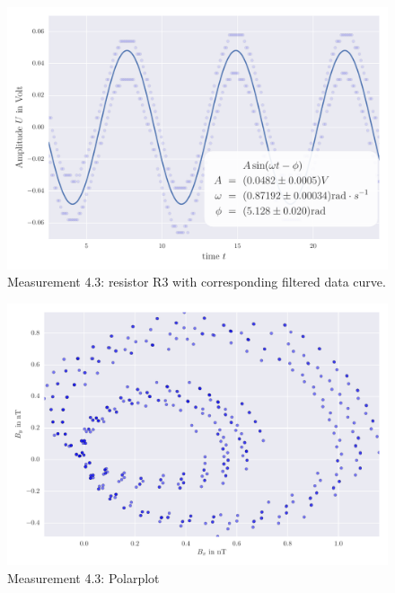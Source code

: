 \begin{figure}[H]
    \centering
    \includegraphics[width=0.7\linewidth]{analysis/figures/fit4_3}
    \caption{Measurement 4.3: resistor R3 with corresponding filtered data curve.}
    \label{fig:4_3_plot}
\end{figure}
\begin{figure}[H]
    \centering
    \includegraphics[width=0.7\linewidth]{analysis/figures/polar4_3}
    \caption{Measurement 4.3: Polarplot}
    \label{fig:4_3_polar}
\end{figure}

